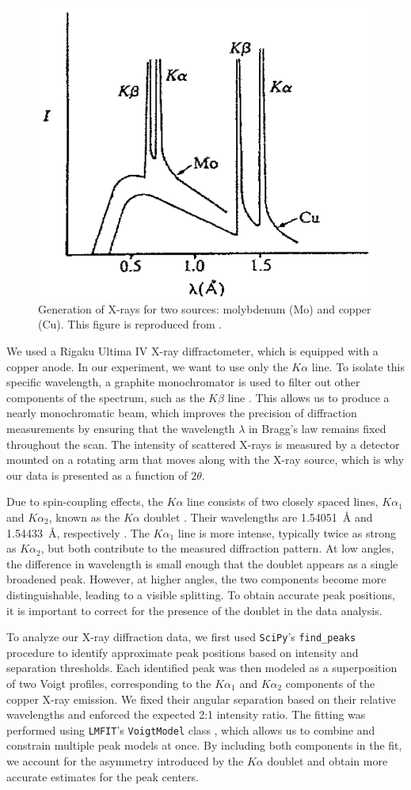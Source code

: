 \documentclass{../paper}
\begin{document}
\begin{figure}
  \centering
  \includegraphics[width=0.6\columnwidth]{assets/Xray-source.png}
  \caption{Generation of X-rays for two sources: molybdenum (Mo) and copper (Cu). This figure is reproduced from \cite{Laing}.}
  \label{fig:x-rays}
\end{figure}

We used a Rigaku Ultima IV X-ray diffractometer, which is equipped with a copper anode. In our experiment, we want to use only the $K\alpha$ line. To isolate this specific wavelength, a graphite monochromator is used to filter out other components of the spectrum, such as the $K\beta$ line \cite{LabManual}. This allows us to produce a nearly monochromatic beam, which improves the precision of diffraction measurements by ensuring that the wavelength $\lambda$ in Bragg's law remains fixed throughout the scan. The intensity of scattered X-rays is measured by a detector mounted on a rotating arm that moves along with the X-ray source, which is why our data is presented as a function of $2\theta$.

Due to spin-coupling effects, the $K\alpha$ line consists of two closely spaced lines, $K\alpha_1$ and $K\alpha_2$, known as the $K\alpha$ doublet \cite{Cullity}. Their wavelengths are 1.54051~\AA{} and 1.54433~\AA{}, respectively \cite{Cullity}. The $K\alpha_1$ line is more intense, typically twice as strong as $K\alpha_2$, but both contribute to the measured diffraction pattern. At low angles, the difference in wavelength is small enough that the doublet appears as a single broadened peak. However, at higher angles, the two components become more distinguishable, leading to a visible splitting. To obtain accurate peak positions, it is important to correct for the presence of the doublet in the data analysis.

To analyze our X-ray diffraction data, we first used {\tt SciPy}'s {\tt find\_peaks} procedure \cite{SciPy} to identify approximate peak positions based on intensity and separation thresholds. Each identified peak was then modeled as a superposition of two Voigt profiles, corresponding to the $K\alpha_1$ and $K\alpha_2$ components of the copper X-ray emission. We fixed their angular separation based on their relative wavelengths and enforced the expected 2:1 intensity ratio. The fitting was performed using {\tt LMFIT}'s {\tt VoigtModel} class \cite{LMFIT}, which allows us to combine and constrain multiple peak models at once. By including both components in the fit, we account for the asymmetry introduced by the $K\alpha$ doublet and obtain more accurate estimates for the peak centers.
\end{document}
